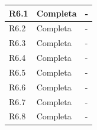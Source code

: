 \begin{longtable}[c]{lll}
R6.1            & Completa             & -                                                                                                                                                                                                                                                         \\ \hline
R6.2            & Completa             & -                                                                                                                                                                                                                                                         \\ \hline
R6.3            & Completa             & -                                                                                                                                                                                                                                                         \\ \hline
R6.4            & Completa             & -                                                                                                                                                                                                                                                         \\ \hline
R6.5            & Completa             & -                                                                                                                                                                                                                                                         \\ \hline
R6.6            & Completa             & -                                                                                                                                                                                                                                                         \\ \hline
R6.7            & Completa             & -                                                                                                                                                                                                                                                         \\ \hline
R6.8             & Completa             & -                                                                                                                                                                                                                                                         \\ \hline

\end{longtable}
